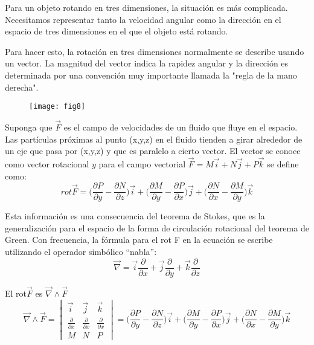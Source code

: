 \documentclass[10pt]{article}
\begin{document}
	\parindent=0.2in
	\hangindent=0.2in
	Para un objeto rotando en tres dimensiones, la situación es más complicada. Necesitamos representar tanto la velocidad angular como la dirección en el espacio de tres dimensiones en el que el objeto está rotando.

	\parindent=0.2in
	\hangindent=0.2in
	Para hacer esto, la rotación en tres dimensiones normalmente se describe usando un vector. La magnitud del vector indica la rapidez angular y la dirección es determinada por una convención muy importante llamada la "regla de la mano derecha".

	\begin{figure}[h]
	\texttt{[image: fig8]}
	\centering
	\end{figure}

	\parindent=0.2in
	\hangindent=0.2in
	Suponga que $\vec{F}$ es el campo de velocidades de un fluido que fluye en el espacio. Las partículas próximas al punto (x,y,z) en el fluido tienden a girar alrededor de un eje que pasa por (x,y,z) y que es paralelo a cierto vector. El vector se conoce como vector rotacional $y$ para el campo vectorial \( \vec{F} = M\vec{i} + N\vec{j} + P\vec{k} \) se define como:
	\[ rot\vec{F} = \big ( \frac{\partial P}{\partial y} - \frac{\partial N}{\partial z}  \big ) \vec{i} + \big ( \frac{\partial M}{\partial y} - \frac{\partial P}{\partial x}  \big )\vec{j} + \big ( \frac{\partial N}{\partial x} - \frac{\partial M}{\partial y}  \big )\vec{k} \] 

	\parindent=0.2in
	\hangindent=0.2in
	Esta información es una consecuencia del teorema de Stokes, que es la generalización para el espacio de la forma de circulación rotacional del teorema de Green. Con frecuencia, la fórmula para el rot F en la ecuación se escribe utilizando el operador simbólico “nabla”:
	\[ \vec{\nabla} = \vec{i} \frac{\partial}{\partial x} + \vec{j} \frac{\partial}{\partial y}  + \vec{k} \frac{\partial}{\partial z}   \]

	\parindent=0.2in
	\hangindent=0.2in
	El rot$\vec{F}$ es \( \vec{\nabla} \wedge \vec{F} \)
	\[ \vec{\nabla} \wedge \vec{F} =
		\begin{vmatrix}
			\vec{i} & \vec{j} & \vec{k} \\
			\frac{\partial}{\partial x} & \frac{\partial}{\partial x} & \frac{\partial}{\partial x} \\
			M & N & P
		\end{vmatrix}
	= \big ( \frac{\partial P}{\partial y} - \frac{\partial N}{\partial z}  \big ) \vec{i} + \big ( \frac{\partial M}{\partial y} - \frac{\partial P}{\partial x}  \big )\vec{j} + \big ( \frac{\partial N}{\partial x} - \frac{\partial M}{\partial y}  \big )\vec{k} \] 
\end{document}
